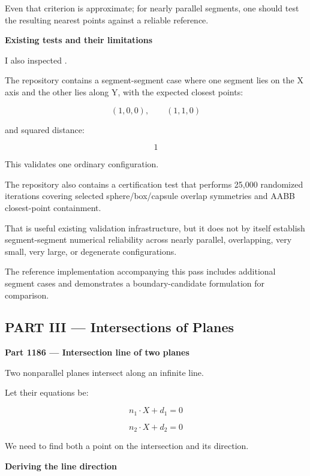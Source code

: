 Even that criterion is approximate; for nearly parallel segments, one should test the resulting nearest points against a reliable reference.

\textbf{Existing tests and their limitations}

I also inspected .

The repository contains a segment-segment case where one segment lies on the X axis and the other lies along Y, with the expected closest points:

\[
(1,0,0),\qquad(1,1,0)
\]

and squared distance:

\[
1
\]

This validates one ordinary configuration.

The repository also contains a certification test that performs 25,000 randomized iterations covering selected sphere/box/capsule overlap symmetries and AABB closest-point containment.

That is useful existing validation infrastructure, but it does not by itself establish segment-segment numerical reliability across nearly parallel, overlapping, very small, very large, or degenerate configurations.

The reference implementation accompanying this pass includes additional segment cases and demonstrates a boundary-candidate formulation for comparison.

\subsection{PART III --- Intersections of Planes}\label{04-visual-computing-ii-ch022-part-iii-intersections-of-planes}

\hypertarget{04-visual-computing-ii-ch022-part-iii-intersections-of-planes}{}

\textbf{Part 1186 --- Intersection line of two planes}

Two nonparallel planes intersect along an infinite line.

Let their equations be:

\[
n_1\cdot X+d_1=0
\]

\[
n_2\cdot X+d_2=0
\]

We need to find both a point on the intersection and its direction.

\textbf{Deriving the line direction}

